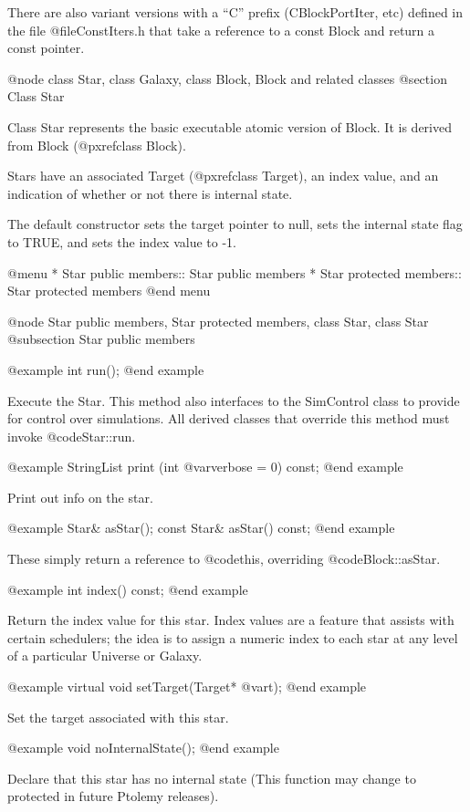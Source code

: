 There are also variant versions with a ``C'' prefix (CBlockPortIter, etc)
defined in the file @file{ConstIters.h} that take a reference to a const Block
and return a const pointer.

@node class Star, class Galaxy, class Block, Block and related classes
@section Class Star

Class Star represents the basic executable atomic version of Block.
It is derived from Block (@pxref{class Block}).

Stars have an associated Target (@pxref{class Target}), an index value,
and an indication of whether or not there is internal state.

The default constructor sets the target pointer to null, sets the internal
state flag to TRUE, and sets the index value to -1.

@menu
* Star public members::         Star public members
* Star protected members::      Star protected members
@end menu

@node Star public members, Star protected members, class Star, class Star
@subsection Star public members

@example
int run();
@end example

Execute the Star.  This method also interfaces to the SimControl
class to provide for control over simulations.  All derived classes
that override this method must invoke @code{Star::run}.

@example
StringList print (int @var{verbose} = 0) const;
@end example

Print out info on the star.

@example
Star& asStar();
const Star& asStar() const;
@end example

These simply return a reference to @code{this}, overriding @code{Block::asStar}.

@example
int index() const;
@end example

Return the index value for this star.  Index values are a feature
that assists with certain schedulers; the idea is to assign a numeric
index to each star at any level of a particular Universe or Galaxy.

@example
virtual void setTarget(Target* @var{t});
@end example

Set the target associated with this star.

@example
void noInternalState();
@end example

Declare that this star has no internal state (This function may
change to protected in future Ptolemy releases).

